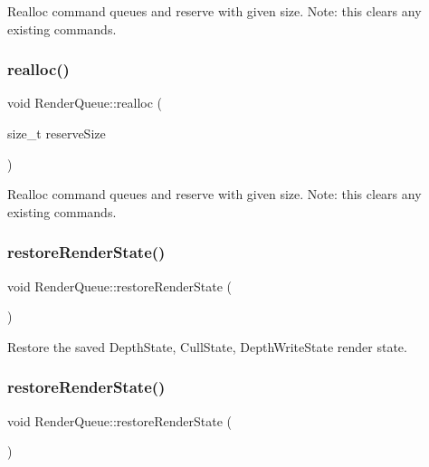 Realloc command queues and reserve with given size. Note\+: this clears any existing commands. \mbox{\label{classRenderQueue_a6a9e1c224b1c5d3c7ac92f9a3e14f23c}} 
\subsubsection{\texorpdfstring{realloc()}{realloc()}\hspace{0.1cm}{\footnotesize\ttfamily [2/2]}}
{\footnotesize\ttfamily void Render\+Queue\+::realloc (\begin{DoxyParamCaption}\item[{size\+\_\+t}]{reserve\+Size }\end{DoxyParamCaption})}

Realloc command queues and reserve with given size. Note\+: this clears any existing commands. \mbox{\label{classRenderQueue_a232643cb44bd75fd6ebdc5ef85ad4460}} 
\subsubsection{\texorpdfstring{restore\+Render\+State()}{restoreRenderState()}\hspace{0.1cm}{\footnotesize\ttfamily [1/2]}}
{\footnotesize\ttfamily void Render\+Queue\+::restore\+Render\+State (\begin{DoxyParamCaption}{ }\end{DoxyParamCaption})}

Restore the saved Depth\+State, Cull\+State, Depth\+Write\+State render state. \mbox{\label{classRenderQueue_a232643cb44bd75fd6ebdc5ef85ad4460}} 
\subsubsection{\texorpdfstring{restore\+Render\+State()}{restoreRenderState()}\hspace{0.1cm}{\footnotesize\ttfamily [2/2]}}
{\footnotesize\ttfamily void Render\+Queue\+::restore\+Render\+State (\begin{DoxyParamCaption}{ }\end{DoxyParamCaption})}

